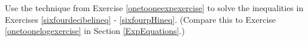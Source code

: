 {Use the technique from Exercise \ref{onetooneexpexercise}  to solve the inequalities in Exercises \ref{sixfourdecibelineq} - \ref{sixfourpHineq}. (Compare this to Exercise  \ref{onetoonelogexercise} in Section \ref{ExpEquations}.)}
{}
